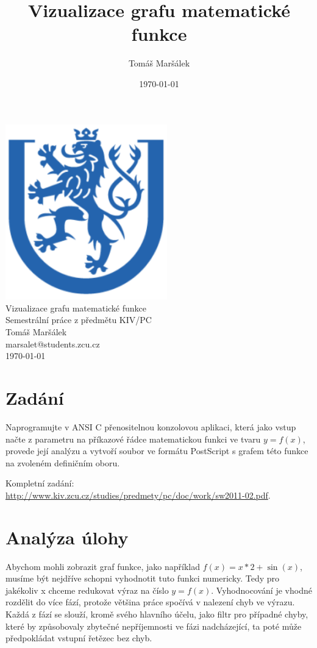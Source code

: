 \documentclass[11pt]{article}
\title{Vizualizace grafu matematické funkce}
\author{Tomáš Maršálek}
\date{\today}
\begin{document}
\begin{titlepage}
\begin{center}
	\includegraphics[width=7cm]{res/znak.png} \\[2cm]
	\huge{Vizualizace grafu matematické funkce} \\[.2cm]
	\Large{Semestrální práce z předmětu KIV/PC} \\[2cm]
	\Large{Tomáš Maršálek} \\
	\large{marsalet@students.zcu.cz} \\[1cm]
	\normalsize{\today}
\end{center}
\end{titlepage}

\section{Zadání}
Naprogramujte v ANSI C přenositelnou konzolovou aplikaci, která jako vstup
načte z parametru na příkazové řádce matematickou funkci ve tvaru $y = f(x)$,
provede její analýzu a vytvoří soubor ve formátu PostScript s grafem této
funkce na zvoleném definičním oboru.

Kompletní zadání:
\url{http://www.kiv.zcu.cz/studies/predmety/pc/doc/work/sw2011-02.pdf}.

\section{Analýza úlohy}
Abychom mohli zobrazit graf funkce, jako například $f(x) = x * 2 + \sin(x)$,
musíme být nejdříve schopni vyhodnotit tuto funkci numericky. Tedy pro
jakékoliv x chceme redukovat výraz na číslo $y = f(x)$. Vyhodnocování je vhodné
rozdělit do více fází, protože většina práce spočívá v nalezení chyb ve výrazu.
Každá z fází se slouží, kromě svého hlavního účelu, jako filtr pro případné
chyby, které by způsobovaly zbytečné nepříjemnosti ve fázi nadcházející, ta
poté může předpokládat vstupní řetězec bez chyb. 
\end{document}
